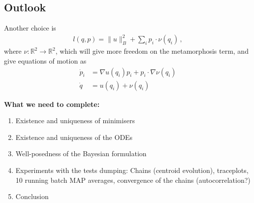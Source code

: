 \documentclass{article}
\begin{document}




\subsection{Outlook}\label{sec:outlook}
Another choice is 
\begin{align}
    l(q,p) = \|u\|_B^2 + \sum_i p_i\cdot \nu(q_i) \, , 
\end{align}
where $\nu:\mathbb R^2 \to \mathbb R^2$, which will give more freedom on the metamorphosis term, and give equations of motion as 
\begin{align}
    \dot p_i  &= \nabla u(q_i)p_i  + p_i \cdot \nabla \nu(q_i)\\
    \dot q &= u(q_i) + \nu(q_i) 
\end{align}

\textbf{What we need to complete:}

\begin{enumerate}
\item Existence and uniqueness of minimisers
\item Existence and uniqueness of the ODEs
\item Well-posedness of the Bayesian formulation
\item Experiments with the tests dumping: Chains (centroid evolution),
traceplots, 10 running batch MAP averages, convergence of the chains
(autocorrelation?)
\item Conclusion
\end{enumerate}



\end{document}
